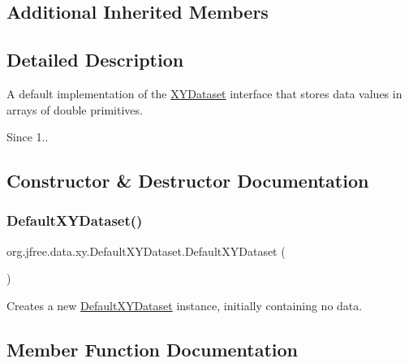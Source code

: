 \subsection*{Additional Inherited Members}


\subsection{Detailed Description}
A default implementation of the \mbox{\hyperlink{interfaceorg_1_1jfree_1_1data_1_1xy_1_1_x_y_dataset}{X\+Y\+Dataset}} interface that stores data values in arrays of double primitives.

\begin{DoxySince}{Since}
1.. 
\end{DoxySince}


\subsection{Constructor \& Destructor Documentation}
\mbox{\label{classorg_1_1jfree_1_1data_1_1xy_1_1_default_x_y_dataset_aeb6942f7255b4a3582d83688f1157e79}} 
\subsubsection{\texorpdfstring{Default\+X\+Y\+Dataset()}{DefaultXYDataset()}}
{\footnotesize\ttfamily org.\+jfree.\+data.\+xy.\+Default\+X\+Y\+Dataset.\+Default\+X\+Y\+Dataset (\begin{DoxyParamCaption}{ }\end{DoxyParamCaption})}

Creates a new {\ttfamily \mbox{\hyperlink{classorg_1_1jfree_1_1data_1_1xy_1_1_default_x_y_dataset}{Default\+X\+Y\+Dataset}}} instance, initially containing no data. 

\subsection{Member Function Documentation}
\mbox{\label{classorg_1_1jfree_1_1data_1_1xy_1_1_default_x_y_dataset_ae5b45f2fa36fbb4a123e5f8cc79e9428}} 
